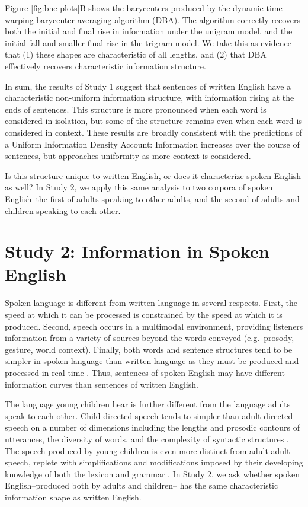 \documentclass[entropy,article,submit,moreauthors,pdftex]{mdpi}
\begin{document}
Figure \ref{fig:bnc-plots}B shows the barycenters produced by the
dynamic time warping barycenter averaging algorithm (DBA). The algorithm
correctly recovers both the initial and final rise in information under
the unigram model, and the initial fall and smaller final rise in the
trigram model. We take this as evidence that (1) these shapes are
characteristic of all lengths, and (2) that DBA effectively recovers
characteristic information structure.

In sum, the results of Study 1 suggest that sentences of written English
have a characteristic non-uniform information structure, with
information rising at the ends of sentences. This structure is more
pronounced when each word is considered in isolation, but some of the
structure remains even when each word is considered in context. These
results are broadly consistent with the predictions of a Uniform
Information Density Account: Information increases over the course of
sentences, but approaches uniformity as more context is considered.

Is this structure unique to written English, or does it characterize
spoken English as well? In Study 2, we apply this same analysis to two
corpora of spoken English--the first of adults speaking to other adults,
and the second of adults and children speaking to each other.

\hypertarget{study-2-information-in-spoken-english}{%
\section{Study 2: Information in Spoken
English}\label{study-2-information-in-spoken-english}}

Spoken language is different from written language in several respects.
First, the speed at which it can be processed is constrained by the
speed at which it is produced. Second, speech occurs in a multimodal
environment, providing listeners information from a variety of sources
beyond the words conveyed (e.g.~prosody, gesture, world context).
Finally, both words and sentence structures tend to be simpler in spoken
language than written language as they must be produced and processed in
real time \citep{christiansen2016}. Thus, sentences of spoken English
may have different information curves than sentences of written English.

The language young children hear is further different from the language
adults speak to each other. Child-directed speech tends to simpler than
adult-directed speech on a number of dimensions including the lengths
and prosodic contours of utterances, the diversity of words, and the
complexity of syntactic structures \citep{snow1972}. The speech produced
by young children is even more distinct from adult-adult speech, replete
with simplifications and modifications imposed by their developing
knowledge of both the lexicon and grammar \citep{clark2009}. In Study 2,
we ask whether spoken English--produced both by adults and children--
has the same characteristic information shape as written English.
\end{document}

